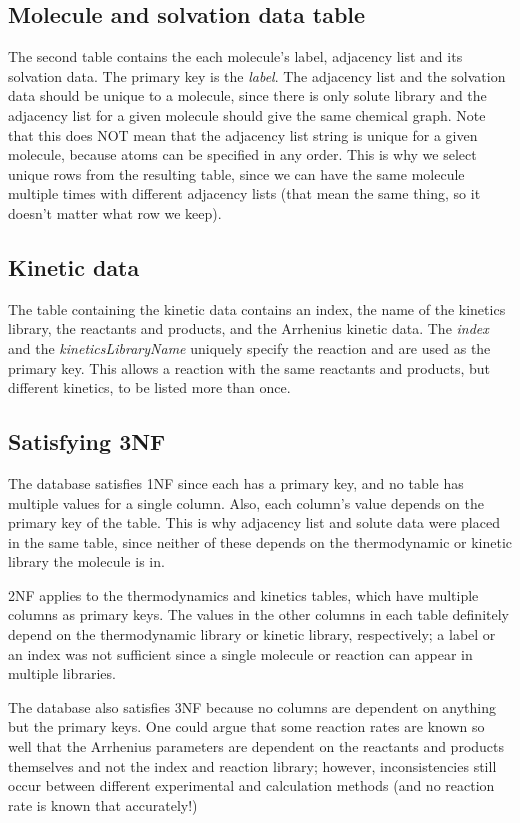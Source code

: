 \documentclass[11pt]{article}
\begin{document}
\subsection{Molecule and solvation data table}
The second table contains the each molecule's label, adjacency list and its solvation data. The primary key is the \emph{label}. The adjacency list and the solvation data should be unique to a molecule, since there is only solute library and the adjacency list for a given molecule should give the same chemical graph. Note that this does NOT mean that the adjacency list string is unique for a given molecule, because atoms can be specified in any order. This is why we select unique rows from the resulting table, since we can have the same molecule multiple times with different adjacency lists (that mean the same thing, so it doesn't matter what row we keep). 

\subsection{Kinetic data}
The table containing the kinetic data contains an index, the name of the kinetics library, the reactants and products, and the Arrhenius kinetic data. The \emph{index} and the \emph{kineticsLibraryName} uniquely specify the reaction and are used as the primary key. This allows a reaction with the same reactants and products, but different kinetics, to be listed more than once.

\subsection{Satisfying 3NF}
The database satisfies 1NF since each has a primary key, and no table has multiple values for a single column. Also, each column's value depends on the primary key of the table. This is why adjacency list and solute data were placed in the same table, since neither of these depends on the thermodynamic or kinetic library the molecule is in.

2NF applies to the thermodynamics and kinetics tables, which have multiple columns as primary keys. The values in the other columns in each table definitely depend on the thermodynamic library or kinetic library, respectively; a label or an index was not sufficient since a single molecule or reaction can appear in multiple libraries.

The database also satisfies 3NF because no columns are dependent on anything but the primary keys. One could argue that some reaction rates are known so well that the Arrhenius parameters are dependent on the reactants and products themselves and not the index and reaction library; however, inconsistencies still occur between different experimental and calculation methods (and no reaction rate is known that accurately!)
\end{document}
